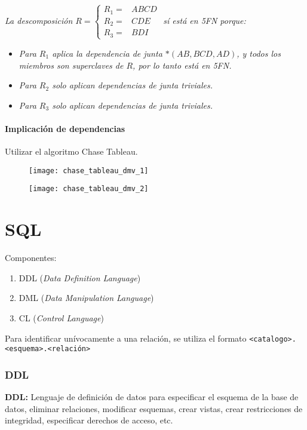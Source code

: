 \documentclass[a4paper, twoside]{article}
\begin{document}
\emph{La descomposición $R = 
\begin{cases}
	R_{1}= & ABCD\\
	R_{2}= & CDE\\
	R_{3}= & BDI
\end{cases}$ sí está en 5FN porque:}
\begin{itemize}
	\item \emph{Para $R_{1}$ aplica la dependencia de junta $*\left(AB,BCD,AD\right)$, y todos los miembros son superclaves de $R$, por lo tanto está en 5FN.}
	\item \emph{Para $R_{2}$ solo aplican dependencias de junta triviales.}
	\item \emph{Para $R_{3}$ solo aplican dependencias de junta triviales.}
\end{itemize}

\subsection{Implicación de dependencias}
Utilizar el algoritmo Chase Tableau.

\begin{figure}[H]
	\centering
	\texttt{[image: chase\_tableau\_dmv\_1]}
\end{figure}

\begin{figure}[H]
	\centering
	\texttt{[image: chase\_tableau\_dmv\_2]}
\end{figure}

\newpage
\part{SQL}
Componentes: 
\begin{enumerate}
	\item DDL (\emph{Data Definition Language})
	\item DML (\emph{Data Manipulation Language})
	\item CL (\emph{Control Language})
\end{enumerate}

Para identificar unívocamente a una relación, se utiliza el formato \texttt{<catalogo>.<esquema>.<relación>}

\section{DDL}
\textbf{DDL:} Lenguaje de definición de datos para especificar el esquema de la base de datos, eliminar relaciones, modificar esquemas, crear vistas, crear restricciones de integridad, especificar derechos de acceso, etc.
\end{document}
